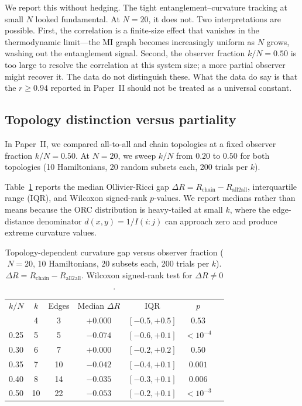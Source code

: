 \documentclass[aps,pra,twocolumn,superscriptaddress,floatfix]{revtex4-2}
\begin{document}
We report this without hedging.  The tight entanglement--curvature tracking at small $N$ looked fundamental.  At $N = 20$, it does not.  Two interpretations are possible.  First, the correlation is a finite-size effect that vanishes in the thermodynamic limit---the MI graph becomes increasingly uniform as $N$ grows, washing out the entanglement signal.  Second, the observer fraction $k/N = 0.50$ is too large to resolve the correlation at this system size; a more partial observer might recover it.  The data do not distinguish these.  What the data do say is that the $r \geq 0.94$ reported in Paper~II should not be treated as a universal constant.

\subsection{Topology distinction versus partiality}
\label{sec:topology}

In Paper~II, we compared all-to-all and chain topologies at a fixed observer fraction $k/N = 0.50$.  At $N = 20$, we sweep $k/N$ from $0.20$ to $0.50$ for both topologies (10 Hamiltonians, 20 random subsets each, 200 trials per $k$).

Table~\ref{tab:topology} reports the median Ollivier-Ricci gap $\Delta R = R_\mathrm{chain} - R_\mathrm{all2all}$, interquartile range (IQR), and Wilcoxon signed-rank $p$-values.  We report medians rather than means because the ORC distribution is heavy-tailed at small $k$, where the edge-distance denominator $d(x,y) = 1/I(i{:}j)$ can approach zero and produce extreme curvature values.

\begin{table}[t]
\caption{Topology-dependent curvature gap versus observer fraction ($N = 20$, 10 Hamiltonians, 20 subsets each, 200 trials per $k$).  $\Delta R = R_\mathrm{chain} - R_\mathrm{all2all}$.  Wilcoxon signed-rank test for $\Delta R \neq 0$.}
\label{tab:topology}
\begin{ruledtabular}
\begin{tabular}{lcccccc}
$k/N$ & $k$ & Edges & Median $\Delta R$ & IQR & $p$ \\
\colrule
0.20 & 4  & 3  & $+0.000$ & $[-0.5, +0.5]$ & $0.53$ \\
0.25 & 5  & 5  & $-0.074$ & $[-0.6, +0.1]$ & $< 10^{-4}$ \\
0.30 & 6  & 7  & $+0.000$ & $[-0.2, +0.2]$ & $0.50$ \\
0.35 & 7  & 10 & $-0.042$ & $[-0.4, +0.1]$ & $0.001$ \\
0.40 & 8  & 14 & $-0.035$ & $[-0.3, +0.1]$ & $0.006$ \\
0.50 & 10 & 22 & $-0.053$ & $[-0.2, +0.1]$ & $< 10^{-3}$ \\
\end{tabular}
\end{ruledtabular}
\end{table}
\end{document}
